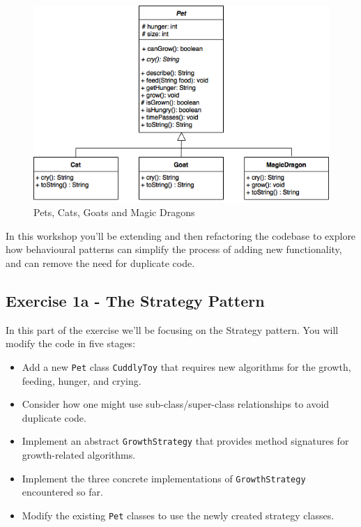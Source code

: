 \documentclass[
]{book}
\providecommand{\tightlist}{%
  \setlength{\itemsep}{0pt}\setlength{\parskip}{0pt}}
\begin{document}
\begin{figure}

{\centering \includegraphics[width=1\linewidth]{images/BasicPets} 

}

\caption{Pets, Cats, Goats and Magic Dragons}\label{fig:basicpets-fig}
\end{figure}

In this workshop you'll be extending and then refactoring the codebase to explore how behavioural patterns can simplify the process of adding new functionality, and can remove the need for duplicate code.

\hypertarget{strategy}{%
\subsection{Exercise 1a - The Strategy Pattern}\label{strategy}}

In this part of the exercise we'll be focusing on the Strategy pattern. You will modify the code in five stages:

\begin{itemize}
\tightlist
\item
  Add a new \texttt{Pet} class \texttt{CuddlyToy} that requires new algorithms for the growth, feeding, hunger, and crying.
\item
  Consider how one might use sub-class/super-class relationships to avoid duplicate code.
\item
  Implement an abstract \texttt{GrowthStrategy} that provides method signatures for growth-related algorithms.
\item
  Implement the three concrete implementations of \texttt{GrowthStrategy} encountered so far.
\item
  Modify the existing \texttt{Pet} classes to use the newly created strategy classes.
\end{itemize}
\end{document}
